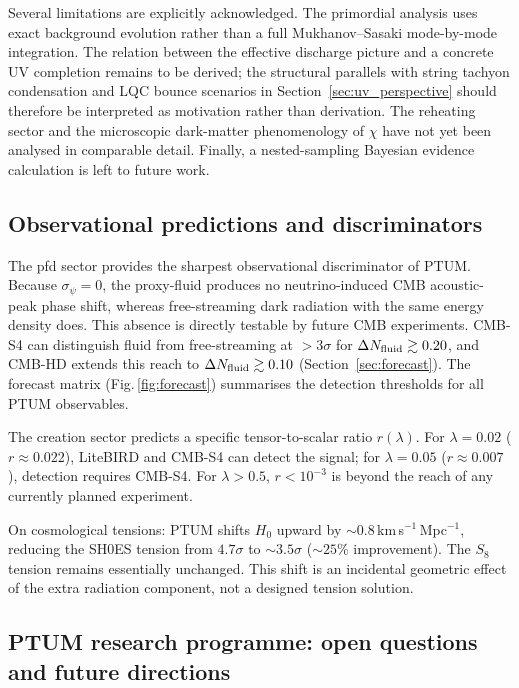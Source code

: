 \documentclass[epj]{svjour}
\begin{document}
Several limitations are explicitly acknowledged. The primordial
analysis uses exact background evolution rather than a full
Mukhanov--Sasaki mode-by-mode integration. The relation between
the effective discharge picture and a concrete UV completion remains
to be derived; the structural parallels with string tachyon
condensation and LQC bounce scenarios in Section~\ref{sec:uv_perspective}
should therefore be interpreted as motivation rather than derivation.
The reheating sector and the microscopic dark-matter phenomenology
of $\chi$ have not yet been analysed in comparable detail.
Finally, a nested-sampling Bayesian evidence calculation is left to
future work.

\subsection{Observational predictions and discriminators}
\label{sec:predictions}

The pfd sector provides the sharpest observational discriminator of
PTUM. Because $\sigma_\psi=0$, the proxy-fluid produces no
neutrino-induced CMB acoustic-peak phase shift, whereas free-streaming
dark radiation with the same energy density does. This absence is
directly testable by future CMB experiments. CMB-S4 can distinguish
fluid from free-streaming at $>3\sigma$ for
$\Delta N_{\rm fluid}\gtrsim0.20$, and CMB-HD extends this reach
to $\Delta N_{\rm fluid}\gtrsim0.10$ (Section~\ref{sec:forecast}).
The forecast matrix (Fig.\,\ref{fig:forecast}) summarises the
detection thresholds for all PTUM observables.

The creation sector predicts a specific tensor-to-scalar ratio
$r(\lambda)$. For $\lambda=0.02$ ($r\approx0.022$), LiteBIRD and
CMB-S4 can detect the signal; for $\lambda=0.05$ ($r\approx0.007$),
detection requires CMB-S4. For $\lambda>0.5$, $r<10^{-3}$ is beyond
the reach of any currently planned experiment.

On cosmological tensions: PTUM shifts $H_0$ upward by
$\sim0.8\,$km\,s$^{-1}$\,Mpc$^{-1}$, reducing the SH0ES tension
from $4.7\sigma$ to $\sim3.5\sigma$ ($\sim25\%$ improvement).
The $S_8$ tension remains essentially unchanged. This shift is an
incidental geometric effect of the extra radiation component, not a
designed tension solution.

\subsection{PTUM research programme: open questions and future directions}
\label{sec:roadmap}
\end{document}
